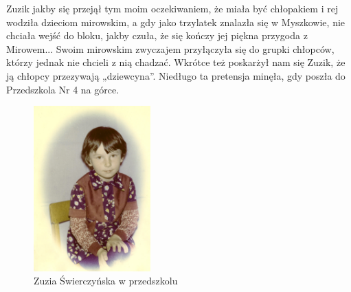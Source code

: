 Zuzik jakby się przejął tym moim oczekiwaniem, że miała być chłopakiem i rej wodziła dzieciom mirowskim, a gdy jako trzylatek znalazła się w Myszkowie, nie chciała wejść do bloku, jakby czuła, że się kończy jej piękna przygoda z Mirowem... Swoim mirowskim zwyczajem przyłączyła się do grupki chłopców, którzy jednak nie chcieli z nią chadzać. Wkrótce też poskarżył nam się Zuzik, że ją chłopcy przezywają „dziewcyna”. Niedługo ta pretensja minęła, gdy poszła do Przedszkola Nr 4 na górce.
\begin{figure}[!h]
\begin{center}
\includegraphics[width=0.4\textwidth]{photo/zuzia_swierczynska_3.jpg}
\caption{Zuzia Świerczyńska w przedszkolu}
\end{center}
\end{figure}

